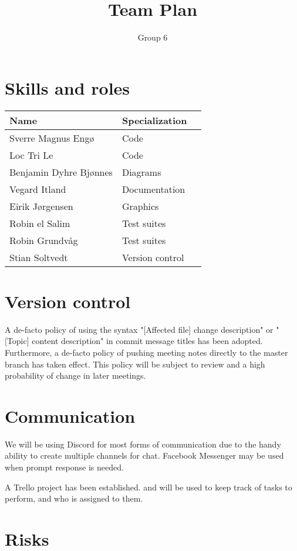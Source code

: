 \documentclass{article}
\title{Team Plan}
\author{Group 6}
\begin{document}
\maketitle

\section*{Skills and roles}

\begin{tabular}{l l l}
    Name                   & Specialization \\
    \hline
    Sverre Magnus Engø     & Code \\
    Loc Tri Le             & Code \\
    Benjamin Dyhre Bjønnes & Diagrams \\
    Vegard Itland          & Documentation \\
    Eirik Jørgensen        & Graphics \\
    Robin el Salim         & Test suites \\
    Robin Grundvåg         & Test suites \\
    Stian Soltvedt         & Version control \\
\end{tabular}

\section*{Version control}

A de-facto policy of using the syntax "[Affected file] change description" or "[Topic] content description" in commit message titles has been adopted. Furthermore, a de-facto policy of pushing meeting notes directly to the master branch has taken effect. This policy will be subject to review and a high probability of change in later meetings.

\section{Communication}

We will be using Discord for most forms of communication due to the handy ability to create multiple channels for chat. Facebook Messenger may be used when prompt response is needed.

A Trello project has been established. and will be used to keep track of tasks to perform, and who is assigned to them.

\section*{Risks}
\end{document}
